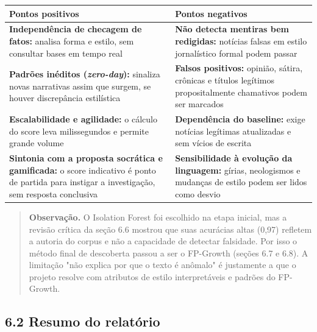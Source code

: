 \documentclass[
  brazilian,
  11pt,
]{article}
\newcounter{none} %
\begin{document}
{\def\LTcaptype{none} %
\begin{longtable}[]{@{}
  >{\raggedright\arraybackslash}p{}
  >{\raggedright\arraybackslash}p{}@{}}
\toprule\noalign{}
\begin{minipage}[b]{\linewidth}\raggedright
Pontos positivos
\end{minipage} & \begin{minipage}[b]{\linewidth}\raggedright
Pontos negativos
\end{minipage} \\
\midrule\noalign{}
\endhead
\bottomrule\noalign{}
\endlastfoot
\textbf{Independência de checagem de fatos:} analisa forma e estilo, sem consultar bases em tempo real & \textbf{Não detecta mentiras bem redigidas:} notícias falsas em estilo jornalístico formal podem passar \\
\textbf{Padrões inéditos (\emph{zero-day}):} sinaliza novas narrativas assim que surgem, se houver discrepância estilística & \textbf{Falsos positivos:} opinião, sátira, crônicas e títulos legítimos propositalmente chamativos podem ser marcados \\
\textbf{Escalabilidade e agilidade:} o cálculo do score leva milissegundos e permite grande volume & \textbf{Dependência do baseline:} exige notícias legítimas atualizadas e sem vícios de escrita \\
\textbf{Sintonia com a proposta socrática e gamificada:} o score indicativo é ponto de partida para instigar a investigação, sem resposta conclusiva & \textbf{Sensibilidade à evolução da linguagem:} gírias, neologismos e mudanças de estilo podem ser lidos como desvio \\
\end{longtable}
}

\begin{quote}
\textbf{Observação.} O Isolation Forest foi escolhido na etapa inicial, mas a revisão crítica da seção 6.6 mostrou que suas acurácias altas (0,97) refletem a autoria do corpus e não a capacidade de detectar falsidade. Por isso o método final de descoberta passou a ser o FP-Growth (seções 6.7 e 6.8). A limitação "não explica por que o texto é anômalo" é justamente a que o projeto resolve com atributos de estilo interpretáveis e padrões do FP-Growth.
\end{quote}

\subsection{6.2 Resumo do relatório}\label{resumo-do-relatuxf3rio}
\end{document}
